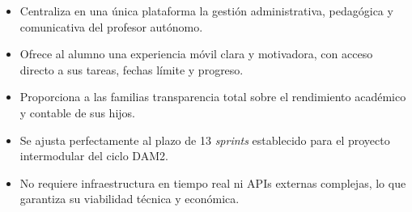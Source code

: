 \documentclass[12pt,a4paper]{report}
\begin{document}
\begin{itemize}
    \item Centraliza en una única plataforma la gestión administrativa,
    pedagógica y comunicativa del profesor autónomo.
    \item Ofrece al alumno una experiencia móvil clara y motivadora,
    con acceso directo a sus tareas, fechas límite y progreso.
    \item Proporciona a las familias transparencia total sobre el
    rendimiento académico y contable de sus hijos.
    \item Se ajusta perfectamente al plazo de 13 \textit{sprints}
    establecido para el proyecto intermodular del ciclo DAM2.
    \item No requiere infraestructura en tiempo real ni APIs externas
    complejas, lo que garantiza su viabilidad técnica y económica.
\end{itemize}
\end{document}
